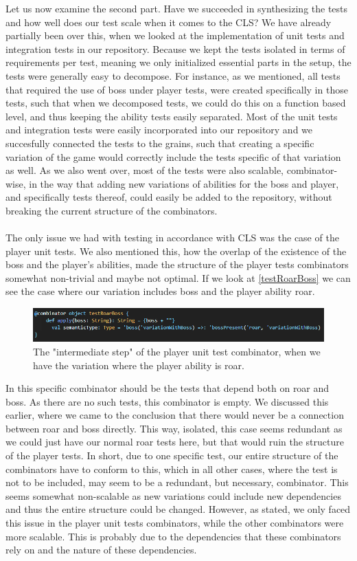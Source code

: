 Let us now examine the second part. Have we succeeded in synthesizing the tests and how well does our test scale when it comes to the CLS? We have already partially been over this, when we looked at the implementation of unit tests and integration tests in our repository. Because we kept the tests isolated in terms of requirements per test, meaning we only initialized essential parts in the setup, the tests were generally easy to decompose. For instance, as we mentioned, all tests that required the use of boss under player tests, were created specifically in those tests, such that when we decomposed tests, we could do this on a function based level, and thus keeping the ability tests easily separated. Most of the unit tests and integration tests were easily incorporated into our repository and we succesfully connected the tests to the grains, such that creating a specific variation of the game would correctly include the tests specific of that variation as well. As we also went over, most of the tests were also scalable, combinator-wise, in the way that adding new variations of abilities for the boss and player, and specifically tests thereof, could easily be added to the repository, without breaking the current structure of the combinators. \\
\\
The only issue we had with testing in accordance with CLS was the case of the player unit tests. We also mentioned this, how the overlap of the existence of the boss and the player's abilities, made the structure of the player tests combinators somewhat non-trivial and maybe not optimal. If we look at \autoref{testRoarBoss} we can see the case where our variation includes boss and the player ability roar.
\begin{figure}[]
    \centering
    \includegraphics[width=\linewidth]{Materials/TestingDiscussion/testRoarBoss}
    \caption{The "intermediate step" of the player unit test combinator, when we have the variation where the player ability is roar.}
    \label{testRoarBoss}
\end{figure} 
In this specific combinator should be the tests that depend both on roar and boss. As there are no such tests, this combinator is empty. We discussed this earlier, where we came to the conclusion that there would never be a connection between roar and boss directly. This way, isolated, this case seems redundant as we could just have our normal roar tests here, but that would ruin the structure of the player tests. In short, due to one specific test, our entire structure of the combinators have to conform to this, which in all other cases, where the test is not to be included, may seem to be a redundant, but necessary, combinator. This seems somewhat non-scalable as new variations could include new dependencies and thus the entire structure could be changed. However, as stated, we only faced this issue in the player unit tests combinators, while the other combinators were more scalable. This is probably due to the dependencies that these combinators rely on and the nature of these dependencies.\\
